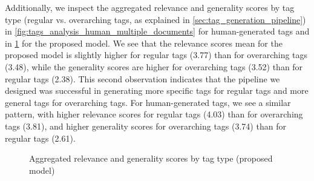 Additionally, we inspect the aggregated relevance and generality scores by tag type (regular vs. overarching tags, as explained in \cref{sec:tag_generation_pipeline}) in \cref{fig:tags_analysis_human_multiple_documents} for human-generated tags and in \cref{fig:tags_analysis_model_multiple_documents} for the proposed model. We see that the relevance scores mean for the proposed model is slightly higher for regular tags (3.77) than for overarching tags (3.48), while the generality scores are higher for overarching tags (3.52) than for regular tags (2.38). This second observation indicates that the pipeline we designed was successful in generating more specific tags for regular tags and more general tags for overarching tags. For human-generated tags, we see a similar pattern, with higher relevance scores for regular tags (4.03) than for overarching tags (3.81), and higher generality scores for overarching tags (3.74) than for regular tags (2.61).


\begin{figure}[h]
    \centering
    \hfill
    \caption{Aggregated relevance and generality scores by tag type (proposed model)}
    \label{fig:tags_analysis_model_multiple_documents}
\end{figure}

